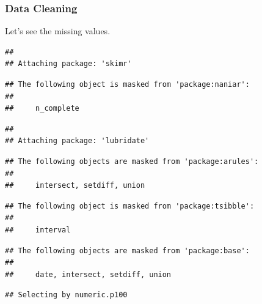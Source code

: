 \documentclass[
]{article}
\begin{document}
\hypertarget{data-cleaning}{%
\subsubsection{Data Cleaning}\label{data-cleaning}}

Let's see the missing values.

\begin{verbatim}
## 
## Attaching package: 'skimr'
\end{verbatim}

\begin{verbatim}
## The following object is masked from 'package:naniar':
## 
##     n_complete
\end{verbatim}

\begin{verbatim}
## 
## Attaching package: 'lubridate'
\end{verbatim}

\begin{verbatim}
## The following objects are masked from 'package:arules':
## 
##     intersect, setdiff, union
\end{verbatim}

\begin{verbatim}
## The following object is masked from 'package:tsibble':
## 
##     interval
\end{verbatim}

\begin{verbatim}
## The following objects are masked from 'package:base':
## 
##     date, intersect, setdiff, union
\end{verbatim}

\begin{verbatim}
## Selecting by numeric.p100
\end{verbatim}
\end{document}
